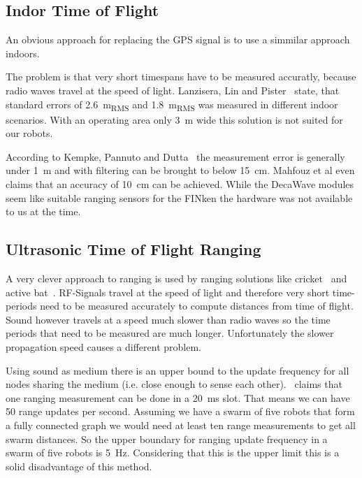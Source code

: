 
\subsection{Indor Time of Flight}
An obvious approach for replacing the GPS signal is to use a simmilar approach indoors.

The problem is that very short timespans have to be measured accuratly, because radio waves travel at the speed of light.
Lanzisera, Lin and Pister~\cite{lanzisera2006} state, that standard errors of \SI{2.6}{\metre_{RMS}} and \SI{1.8}{\metre_{RMS}} was measured in different indoor scenarios.
With an operating area only \SI{3}{\metre} wide this solution is not suited for our robots.


According to Kempke, Pannuto and Dutta~\cite{uwb_localisation_copter} the measurement error is generally under \SI{1}{\metre} and with filtering can be brought to below \SI{15}{\centi\metre}.
Mahfouz et al\cite{uwb_decawave} even claims that an accuracy of \SI{10}{\centi\metre} can be achieved.
While the DecaWave modules seem like suitable ranging sensors for the FINken the hardware was not available to us at the time.

\subsection{Ultrasonic Time of Flight Ranging}
A very clever approach to ranging is used by ranging solutions like cricket~\cite{cricket_01} and active bat~\cite{active_bat}. 
RF-Signals travel at the speed of light and therefore very short time-periods need to be measured accurately to compute distances from time of flight.
Sound however travels at a speed much slower than radio waves so the time periods that need to be measured are much longer.
Unfortunately the slower propagation speed causes a different problem.

Using sound as medium there is an upper bound to the update frequency for all nodes sharing the medium (i.e. close enough to sense each other).~\cite{active_bat} claims that one ranging measurement can be done in a \SI{20}{\milli\second} slot.
That means we can have 50 range updates per second.
Assuming we have a swarm of five robots that form a fully connected graph we would need at least ten range measurements to get all swarm distances.
So the upper boundary for ranging update frequency in a swarm of five robots is \SI{5}{\hertz}.
Considering that this is the upper limit this is a solid disadvantage of this method. 

